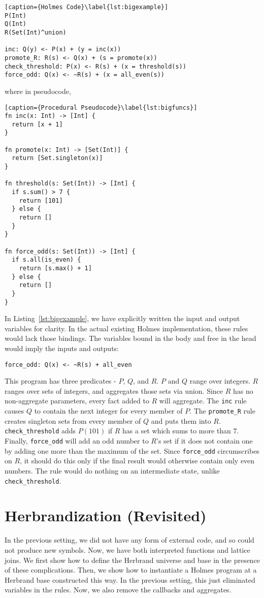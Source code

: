 \begin{lstlisting}[caption={Holmes Code}\label{lst:bigexample}] 
P(Int)
Q(Int)
R(Set(Int)^union)

inc: Q(y) <- P(x) + (y = inc(x))
promote_R: R(s) <- Q(x) + (s = promote(x))
check_threshold: P(x) <- R(s) + (x = threshold(s))
force_odd: Q(x) <- ~R(s) + (x = all_even(s))
\end{lstlisting}
where in pseudocode,
\begin{lstlisting}[caption={Procedural Pseudocode}\label{lst:bigfuncs}]
fn inc(x: Int) -> [Int] {
  return [x + 1]
}

fn promote(x: Int) -> [Set(Int)] {
  return [Set.singleton(x)]
}

fn threshold(s: Set(Int)) -> [Int] {
  if s.sum() > 7 {
    return [101]  
  } else {
    return []
  }
}

fn force_odd(s: Set(Int)) -> [Int] {
  if s.all(is_even) {
    return [s.max() + 1]
  } else {
    return []
  }
}
\end{lstlisting}

In Listing~\ref{lst:bigexample}, we have explicitly written the input and output variables for clarity.
In the actual existing Holmes implementation, these rules would lack those bindings.
The variables bound in the body and free in the head would imply the inputs and outputs:
\begin{lstlisting}[numbers=none]
force_odd: Q(x) <- ~R(s) + all_even
\end{lstlisting}

This program has three predicates - $P$, $Q$, and $R$.
$P$ and $Q$ range over integers.
$R$ ranges over sets of integers, and aggregates those sets via union.
Since $R$ has no non-aggregate parameters, every fact added to $R$ will aggregate.
The \texttt{inc} rule causes $Q$ to contain the next integer for every member of $P$.
The \texttt{promote_R} rule creates singleton sets from every member of $Q$ and puts them into $R$.
\texttt{check_threshold} adds $P(101)$ if $R$ has a set which sums to more than $7$.
Finally, \texttt{force_odd} will add an odd number to $R$'s set if it does not contain one by adding one more than the maximum of the set.
Since \texttt{force_odd} circumscribes on $R$, it should do this only if the final result would otherwise contain only even numbers.
The rule would do nothing on an intermediate state, unlike \texttt{check_threshold}.
\
\section{Herbrandization (Revisited)}
\label{formal:sec:herbrand}
In the previous setting, we did not have any form of external code, and so could not produce new symbols.
Now, we have both interpreted functions and lattice joins.
We first show how to define the Herbrand universe and base in the presence of these complications.
Then, we show how to instantiate a Holmes program at a Herbrand base constructed this way.
In the previous setting, this just eliminated variables in the rules.
Now, we also remove the callbacks and aggregates.


